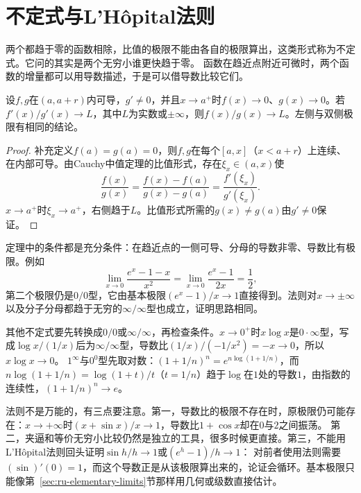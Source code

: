 \section{不定式与L'Hôpital法则}
\label{sec:ru-lhopital}

两个都趋于零的函数相除，比值的极限不能由各自的极限算出，这类形式称为不定式。它问的其实是两个无穷小谁更快趋于零。
函数在趋近点附近可微时，两个函数的增量都可以用导数描述，于是可以借导数比较它们。

\begin{theorem}[L'Hôpital法则]
\label{thm:ru-lhopital}
设$f,g$在$(a,a+r)$内可导，$g'\neq0$，并且$x\to a^+$时$f(x)\to0$、$g(x)\to0$。若$f'(x)/g'(x)\to L$，其中$L$为实数或$\pm\infty$，则$f(x)/g(x)\to L$。左侧与双侧极限有相同的结论。
\end{theorem}
\begin{proof}
补充定义$f(a)=g(a)=0$，则$f,g$在每个$[a,x]$（$x<a+r$）上连续、在内部可导。由Cauchy中值定理的比值形式，存在$\xi_x\in(a,x)$使
\[
 \frac{f(x)}{g(x)}=\frac{f(x)-f(a)}{g(x)-g(a)}=\frac{f'(\xi_x)}{g'(\xi_x)}.
\]
$x\to a^+$时$\xi_x\to a^+$，右侧趋于$L$。比值形式所需的$g(x)\neq g(a)$由$g'\neq0$保证。
\end{proof}
定理中的条件都是充分条件：在趋近点的一侧可导、分母的导数非零、导数比有极限。例如
\[
 \lim_{x\to0}\frac{e^x-1-x}{x^2}=\lim_{x\to0}\frac{e^x-1}{2x}=\frac12,
\]
第二个极限仍是$0/0$型，它由基本极限$(e^x-1)/x\to1$直接得到。法则对$x\to\pm\infty$以及分子分母都趋于无穷的$\infty/\infty$型也成立，证明思路相同。

其他不定式要先转换成$0/0$或$\infty/\infty$，再检查条件。$x\to0^+$时$x\log x$是$0\cdot\infty$型，写成$\log x/(1/x)$后为$\infty/\infty$型，导数比$(1/x)/(-1/x^2)=-x\to0$，所以$x\log x\to0$。
$1^\infty$与$0^0$型先取对数：$(1+1/n)^n=e^{n\log(1+1/n)}$，而$n\log(1+1/n)=\log(1+t)/t$（$t=1/n$）趋于$\log$在$1$处的导数$1$，由指数的连续性，$(1+1/n)^n\to e$。

法则不是万能的，有三点要注意。第一，导数比的极限不存在时，原极限仍可能存在：$x\to+\infty$时$(x+\sin x)/x\to1$，导数比$1+\cos x$却在$0$与$2$之间振荡。
第二，夹逼和等价无穷小比较仍然是独立的工具，很多时候更直接。第三，不能用L'Hôpital法则回头证明$\sin h/h\to1$或$(e^h-1)/h\to1$：
对前者使用法则需要$(\sin)'(0)=1$，而这个导数正是从该极限算出来的，论证会循环。基本极限只能像第~\ref{sec:ru-elementary-limits}节那样用几何或级数直接估计。
